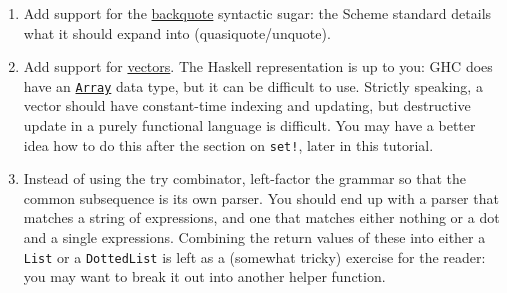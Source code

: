 \begin{enumerate}
	\item Add support for the \href{http://www.schemers.org/Documents/Standards/R5RS/HTML/r5rs-Z-H-7.html\#\%_sec_4.2.6}{backquote} syntactic sugar: the Scheme standard details what it should expand into (quasiquote/unquote).
	\item Add support for \href{http://www.schemers.org/Documents/Standards/R5RS/HTML/r5rs-Z-H-9.html\#\%_sec_6.3.6}{vectors}. The Haskell representation is up to you: GHC does have an \href{http://www.haskell.org/ghc/docs/latest/html/libraries/base/Data-Array.html}{\texttt{Array}} data type, but it can be difficult to use. Strictly speaking, a vector should have constant-time indexing and updating, but destructive update in a purely functional language is difficult. You may have a better idea how to do this after the section on \verb|set!|, later in this tutorial.
	\item Instead of using the try combinator, left-factor the grammar so that the common subsequence is its own parser. You should end up with a parser that matches a string of expressions, and one that matches either nothing or a dot and a single expressions. Combining the return values of these into either a \verb|List| or a \verb|DottedList| is left as a (somewhat tricky) exercise for the reader: you may want to break it out into another helper function.
\end{enumerate}
